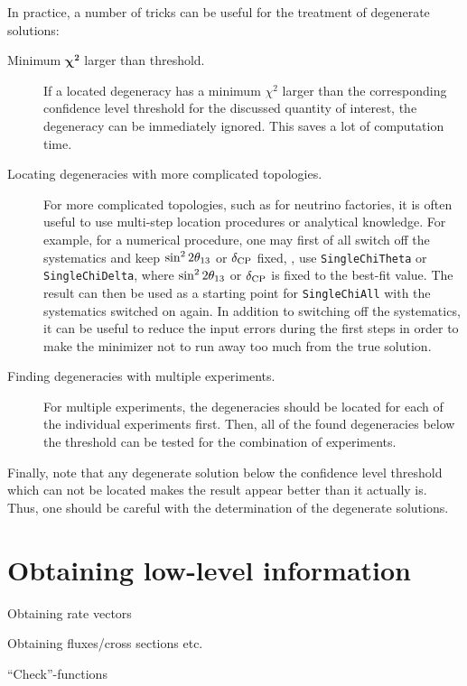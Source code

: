 In practice, a number of tricks can be useful for the treatment of degenerate solutions:
\begin{description}
\item[Minimum $\boldsymbol{\chi^2}$ larger than threshold.] If a located degeneracy has a minimum $\chi^2$ larger than the corresponding confidence level threshold for the discussed quantity of interest, the degeneracy can be immediately ignored. This saves a lot of computation time.
\item[Locating degeneracies with more complicated topologies.] For more complicated topologies, such as for neutrino factories, it is often useful to use multi-step location procedures or analytical knowledge. For example, for a numerical procedure, one may first of all switch off the systematics and keep $\sin^2 2 \theta_{13}$ or $\delta_{\mathrm{CP}}$ fixed, \ie, use {\tt SingleChiTheta} or {\tt SingleChiDelta}, where $\sin^2 2 \theta_{13}$ or $\delta_{\mathrm{CP}}$ is fixed to the best-fit value. The result can then be used as a starting point for {\tt SingleChiAll} with the systematics switched on again. In addition to switching off the systematics, it can be useful to reduce the input errors during the first steps in order to make the minimizer not to run away too much from the true solution.
\item[Finding degeneracies with multiple experiments.] For multiple experiments, the degeneracies should be located for each of the individual experiments first. Then, all of the found degeneracies below the threshold can be tested for the combination of experiments.  
\end{description}
Finally, note that any degenerate solution below the confidence level threshold which can not be located makes the result appear better than it actually is. Thus, one should be careful with the determination of the degenerate solutions.

\chapter{Obtaining low-level information}

\bi
\item
 Obtaining rate vectors
\item
 Obtaining fluxes/cross sections etc.
\item
 ``Check''-functions
\ei

